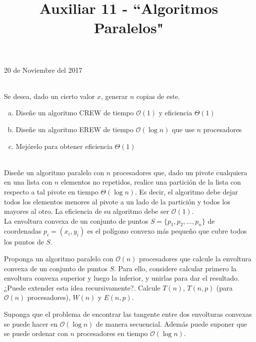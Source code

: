 \documentclass[dcc,uchile]{fcfmcourse}
\title{Auxiliar 11 - ``Algoritmos Paralelos"}
\theoremstyle{plain}
\theoremstyle{definition}
\begin{document}
\maketitle
\begin{center}
20 de Noviembre del 2017
\end{center}


\vspace{-1ex}


\begin{problems}
\\
Se desea, dado un cierto valor $x$, generar $n$ copias de este.
\begin{enumerate}[a)]
    \item Diseñe un algoritmo CREW de tiempo $\mathcal{O}(1)$ y eficiencia $\Theta(1)$
    \item Diseñe un algoritmo EREW de tiempo $\mathcal{O}(\log n)$ que use $n$ procesadores
    \item Mejórelo para obtener eficiencia $\Theta(1)$
\end{enumerate}

\\
Diseñe un algoritmo paralelo con $n$ procesadores que, dado un pivote cualquiera en una lista con $n$ elementos no repetidos, realice una partición de la lista con respecto a tal pivote en tiempo $\Theta(\log{n})$. Es decir, el algoritmo debe dejar todos los elementos menores al pivote a un lado de la partición y todos los mayores al otro. La eficiencia de su algoritmo debe ser $\mathcal{O}(1)$.
\\
La envoltura convexa de un conjunto de puntos $S = \{p_1, p_2, \ldots , p_n\}$ de coordenadas $p_i = (x_i, y_i)$ es el polígono convexo más pequeño que cubre todos los puntos de $S$.\par

Proponga un algoritmo paralelo con $\mathcal{O}(n)$ procesadores que calcule la envoltura convexa de un
conjunto de puntos $S$. Para ello, considere calcular primero la envoltura convexa superior y luego la inferior, y unirlas para dar el resultado. ¿Puede extender esta idea recursivamente?. Calcule $T(n)$, $T(n, p)$ (para $\mathcal{O}(n)$ procesadores), $W(n)$ y $E(n, p)$.\par

Suponga que el problema de encontrar las tangente entre dos envolturas convexas se puede hacer en $\mathcal{O}(\log{n})$ de manera secuencial. Además puede suponer que se puede ordenar con $n$ procesadores en tiempo $\mathcal{O}(\log{n})$.
\end{problems}
\end{document}
